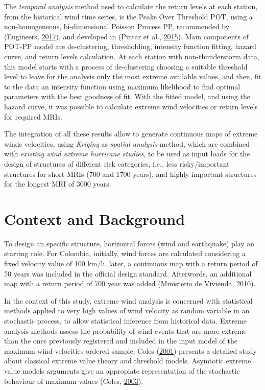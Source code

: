 \documentclass[12pt,oneside]{reedthesis}
\begin{document}
The \emph{temporal analysis} method used to calculate the return levels at each station, from the historical wind time series, is the Peaks Over Threshold POT, using a non-homogeneous, bi-dimensional Poisson Process PP, recommended by (Engineers, \protect\hyperlink{ref-Asce2017}{2017}), and developed in (Pintar et al., \protect\hyperlink{ref-Pintar2015}{2015}). Main components of POT-PP model are de-clustering, thresholding, intensity function fitting, hazard curve, and return levels calculation. At each station with non-thunderstorm data, this model starts with a process of de-clustering choosing a suitable threshold level to leave for the analysis only the most extreme available values, and then, fit to the data an intensity function using maximum likelihood to find optimal parameters with the best goodness of fit. With the fitted model, and using the hazard curve, it was possible to calculate extreme wind velocities or return levels for required MRIs.

The integration of all these results allow to generate continuous maps of extreme winds velocities, using \emph{Kriging} as \emph{spatial analysis} method, which are combined with \emph{existing wind extreme hurricane studies}, to be used as input loads for the design of structures of different risk categories, i.e., less risky/important structures for short MRIs (700 and 1700 years), and highly important structures for the longest MRI of 3000 years.

\hypertarget{context-and-background}{%
\section{Context and Background}\label{context-and-background}}

To design an specific structure, horizontal forces (wind and earthquake) play an starring role. For Colombia, initially, wind forces are calculated considering a fixed velocity value of 100 km/h, later, a continuous map with a return period of 50 years was included in the official design standard. Afterwords, an additional map with a return period of 700 year was added (Ministerio de Vivienda, \protect\hyperlink{ref-nsr10}{2010}).

In the context of this study, extreme wind analysis is concerned with statistical methods applied to very high values of wind velocity as random variable in an stochastic process, to allow statistical inference from historical data. Extreme analysis methods assess the probability of wind events that are more extreme than the ones previously registered and included in the input model of the maximum wind velocities ordered sample. Coles (\protect\hyperlink{ref-Coles2001}{2001}) presents a detailed study about classical extreme value theory and threshold models. Asymtotic extreme value models arguments give an appropiate representation of the stochastic behaviour of maximum values (Coles, \protect\hyperlink{ref-Coles2003}{2003}).
\end{document}
